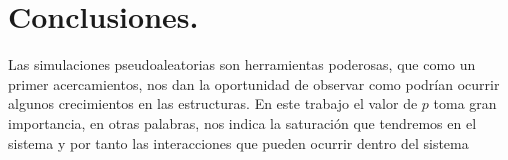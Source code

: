 \documentclass{article}
\begin{document}
\section{Conclusiones.}
 Las simulaciones pseudoaleatorias son herramientas poderosas, que como un primer acercamientos, nos dan la oportunidad de observar como podrían ocurrir algunos crecimientos en las estructuras. En este trabajo el valor de $p$ toma gran importancia, en otras palabras, nos indica la saturación que tendremos en el sistema y por tanto las interacciones que pueden ocurrir dentro del sistema 


\end{document}
